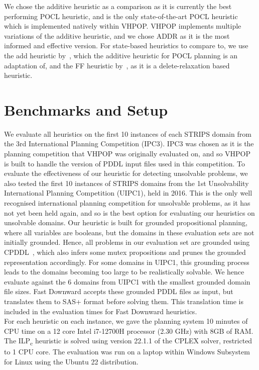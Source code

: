 We chose the additive heuristic as a comparison as it is currently the best performing POCL heuristic, and is the only state-of-the-art POCL heuristic which is implemented natively within VHPOP. VHPOP implements multiple variations of the additive heuristic, and we chose ADDR as it is the most informed and effective version. For state-based heuristics to compare to, we use the add heuristic by~\cite{Geffner2000Add}, which the additive heuristic for POCL planning is an adaptation of, and the FF heuristic by~\cite{Hoffmann2001FFPlanning}, as it is a delete-relaxation based heuristic.\\


\section{Benchmarks and Setup}


We evaluate all heuristics on the first 10 instances of each STRIPS domain from the 3rd International Planning Competition (IPC3). IPC3 was chosen as it is the planning competition that VHPOP was originally evaluated on, and so VHPOP is built to handle the version of PDDL input files used in this competition. To evaluate the effectiveness of our heuristic for detecting unsolvable problems, we also tested the first 10 instances of STRIPS domains from the 1st Unsolvability International Planning Competition (UIPC1), held in 2016. This is the only well recognised international planning competition for unsolvable problems, as it has not yet been held again, and so is the best option for evaluating our heuristics on unsolvable domains. Our heuristic is built for grounded propositional planning, where all variables are booleans, but the domains in these evaluation sets are not initially grounded. Hence, all problems in our evaluation set are grounded using CPDDL~\citep{Fiser2020FamGroups}, which also infers some mutex propositions and prunes the grounded representation accordingly. For some domains in UIPC1, this grounding process leads to the domains becoming too large to be realistically solvable. We hence evaluate against the 6 domains from UIPC1 with the smallest grounded domain file sizes. Fast Downward accepts these grounded PDDL files as input, but translates them to SAS+ format before solving them. This translation time is included in the evaluation times for Fast Downward heuristics.\\


For each heuristic on each instance, we gave the planning system 10 minutes of CPU time on a 12 core Intel i7-12700H processor (2.30 GHz) with 8GB of RAM. The ILP\textsubscript{c} heuristic is solved using version 22.1.1 of the CPLEX solver, restricted to 1 CPU core. The evaluation was run on a laptop within Windows Subsystem for Linux using the Ubuntu 22 distribution.\\


